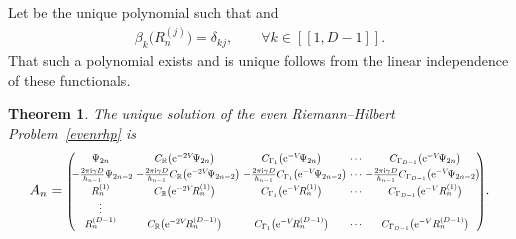 \documentclass[pdftex]{sigma}
\numberwithin{equation}{section}
\newtheorem{Theorem}{Theorem}[section]
\begin{document}
Let  be the unique polynomial such that
and
\begin{align*}
\beta_k\big(R^{(j)}_n\big) = \delta_{kj},\qquad \forall k \in [\![ 1, D-1 ]\!].
\end{align*}
That such a polynomial exists and is unique follows from the linear independence of these functionals.

\begin{Theorem}
The unique solution of the \textit{even} Riemann--Hilbert Problem~{\rm \ref{evenrhp}} is
\begin{gather*}%
A_{n}
=\resizebox{.87\hsize}{!}{$\left(\begin{matrix}
\Psi_{2n} & C_\mathbb{R}\big({\rm e}^{-2V}\!\Psi_{2n}\big) & C_{\Gamma_1}\big({\rm e}^{-V}\!\Psi_{2n}\big) &\cdots & C_{\Gamma_{D-1}}\big({\rm e}^{-V}\!\Psi_{2n}\big) \\[1mm]
\!\!- \frac{2\pi {\rm i} \gamma D}{h_{n-1}}\Psi_{2n-2}\!\!\!\! & - \frac{2\pi {\rm i} \gamma D}{h_{n-1}} C_\mathbb{R}\big({\rm e}^{-2V}\!\Psi_{2n-2}\big)\!\!\!\! & - \frac{2\pi {\rm i} \gamma D}{h_{n-1}} C_{\Gamma_1}\big({\rm e}^{-V}\!\Psi_{2n-2}\big)\!\!\!\! & \cdots & \!\!\!\!\!- \frac{2\pi {\rm i} \gamma D}{h_{n-1}} C_{\Gamma_{D-1}}\big({\rm e}^{-V}\!\Psi_{2n-2}\big) \!\!\\[1mm]
R^{(1)}_n & C_\mathbb{R}\big({\rm e}^{-2V}\!R^{(1)}_n\big) & C_{\Gamma_1}\big({\rm e}^{-V}\!R^{(1)}_n\big) & \cdots & C_{\Gamma_{D-1}}\big({\rm e}^{-V}R^{(1)}_n\big) \\
\vdots \\
R^{(D-1)}_n & C_\mathbb{R}\big({\rm e}^{-2V}\!R^{(D-1)}_n \big) & C_{\Gamma_1}\big({\rm e}^{-V}\!R^{(D-1)}_n \big) & \cdots & C_{\Gamma_{D-1}}\big({\rm e}^{-V}R^{(D-1)}_n \big) \\
\end{matrix}\right)$}.
\end{gather*}
\end{Theorem}
\end{document}

